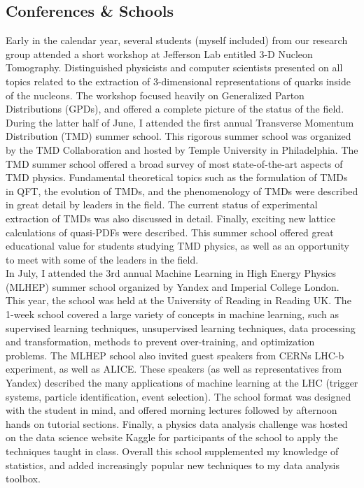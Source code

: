\subsection{Conferences \& Schools}
Early in the calendar year, several students (myself included) from our research group attended a short workshop at Jefferson Lab entitled 3-D Nucleon Tomography.  Distinguished physicists and computer scientists presented on all topics related to the extraction of 3-dimensional representations of quarks inside of the nucleons.  The workshop focused heavily on Generalized Parton Distributions (GPDs), and offered a complete picture of the status of the field.  \\
During the latter half of June, I attended the first annual Transverse Momentum Distribution (TMD) summer school.  This rigorous summer school was organized by the TMD Collaboration and hosted by Temple University in Philadelphia.  The TMD summer school offered a broad survey of most state-of-the-art aspects of TMD physics.  Fundamental theoretical topics such as the formulation of TMDs in QFT, the evolution of TMDs, and the phenomenology of TMDs were described in great detail by leaders in the field.  The current status of experimental extraction of TMDs was also discussed in detail.  Finally, exciting new lattice calculations of quasi-PDFs were described.  This summer school offered great educational value for students studying TMD physics, as well as an opportunity to meet with some of the leaders in the field.  \\
In July, I attended the 3rd annual Machine Learning in High Energy Physics (MLHEP) summer school organized by Yandex and Imperial College London.  This year, the school was held at the University of Reading in Reading UK.  The 1-week school covered a large variety of concepts in machine learning, such as supervised learning techniques,  unsupervised learning techniques, data processing and transformation, methods to prevent over-training, and optimization problems.  The MLHEP school also invited guest speakers from CERNs LHC-b experiment, as well as ALICE.  These speakers (as well as representatives from Yandex) described the many applications of machine learning at the LHC (trigger systems, particle identification, event selection).  The school format was designed with the student in mind, and offered morning lectures followed by afternoon hands on tutorial sections.  Finally, a physics data analysis challenge was hosted on the data science website Kaggle for participants of the school to apply the techniques taught in class.  Overall this school supplemented my knowledge of statistics, and added increasingly popular new techniques to my data analysis toolbox.    

